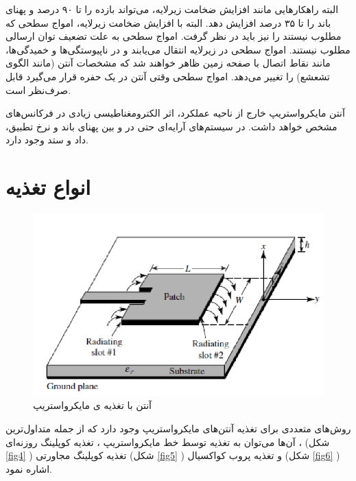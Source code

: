البته راهکارهایی مانند افزایش ضخامت زیرلایه، می‌تواند بازده را تا ۹۰ درصد و پهنای باند را تا ۳۵ درصد افزایش دهد. البته با افزایش ضخامت زیرلایه، امواج سطحی
 که مطلوب نیستند را نیز باید در نظر گرفت. امواج سطحی به علت تضعیف توان ارسالی مطلوب نیستند. امواج سطحی در زیرلایه انتقال می‌یابند و در ناپیوستگی‌ها و خمیدگی‌ها، مانند نقاط اتصال با صفحه زمین 
 ظاهر خواهند شد که مشخصات آنتن (مانند الگوی تشعشع) را تغییر می‌دهد. امواج سطحی وقتی آنتن در یک حفره قرار می‌گیرد قابل صرف‌نظر است.


آنتن مایکرواستریپ خارج از ناحیه عملکرد، اثر الکترومغناطیسی زیادی در فرکانس‌های مشخص خواهد داشت. در سیستم‌های آرایه‌ای حتی در
 و
 بین پهنای باند و نرخ تطبیق، داد و ستد
  وجود دارد.


\section{انواع تغذیه}
\begin{figure}
	\centering
	\includegraphics[scale=0.3]{Images/fig3.png}
	\caption{آنتن با تغذیه ی مایکرواستریپ}
	\label{fig3}
\end{figure}
روش‌های متعددی برای تغذیه آنتن‌های مایکرواستریپ وجود دارد که از جمله متداول‌ترین آن‌ها می‌توان به تغذیه توسط خط مایکرواستریپ
،
تغذیه کوپلینگ روزنه‌ای
،
 (شکل
\ref{fig4}
)
تغذیه کوپلینگ مجاورتی
(شکل
\ref{fig5}
)
و تغذیه پروب کواکسیال
 (شکل
\ref{fig6}
)
اشاره نمود.  




